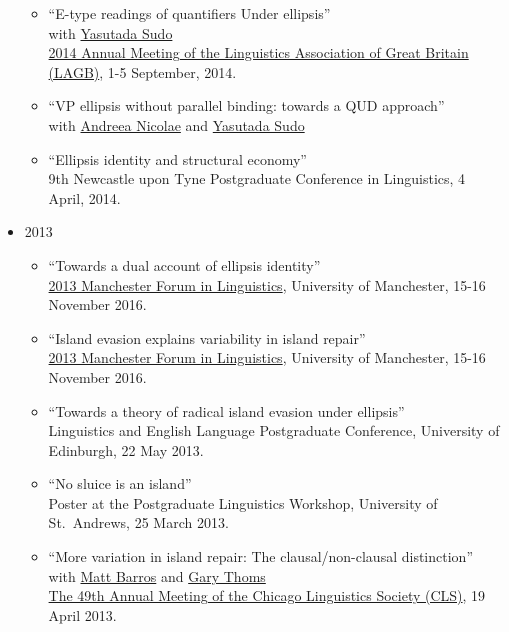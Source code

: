 \documentclass[]{article}
\providecommand{\tightlist}{%
  \setlength{\itemsep}{0pt}\setlength{\parskip}{0pt}}
\begin{document}
\begin{itemize}
  \begin{itemize}
  \tightlist
  \item
    ``E-type readings of quantifiers Under ellipsis''\\
    with \href{http://www.ucl.ac.uk/~ucjtudo/}{Yasutada Sudo}\\
    \href{http://www.lagb.org.uk/lagb2014/home}{2014 Annual Meeting of
    the Linguistics Association of Great Britain (LAGB)}, 1-5 September,
    2014.
  \item
    ``VP ellipsis without parallel binding: towards a QUD approach''\\
    with \href{...}{Andreea Nicolae} and
    \href{http://www.ucl.ac.uk/~ucjtudo/}{Yasutada Sudo}
  \item
    ``Ellipsis identity and structural economy''\\
    9th Newcastle upon Tyne Postgraduate Conference in Linguistics, 4
    April, 2014.
  \end{itemize}
\item
  2013

  \begin{itemize}
  \tightlist
  \item
    ``Towards a dual account of ellipsis identity''\\
    \href{https://mfilconf.wordpress.com/archive/mfil-2013-programme/}{2013
    Manchester Forum in Linguistics}, University of Manchester, 15-16
    November 2016.
  \item
    ``Island evasion explains variability in island repair''\\
    \href{https://mfilconf.wordpress.com/archive/mfil-2013-programme/}{2013
    Manchester Forum in Linguistics}, University of Manchester, 15-16
    November 2016.
  \item
    ``Towards a theory of radical island evasion under ellipsis''\\
    Linguistics and English Language Postgraduate Conference, University
    of Edinburgh, 22 May 2013.
  \item
    ``No sluice is an island''\\
    Poster at the Postgraduate Linguistics Workshop, University of
    St.~Andrews, 25 March 2013.
  \item
    ``More variation in island repair: The clausal/non-clausal
    distinction''\\
    with \href{...}{Matt Barros} and \href{...}{Gary Thoms}\\
    \href{...}{The 49th Annual Meeting of the Chicago Linguistics
    Society (CLS)}, 19 April 2013.
  \end{itemize}
\end{itemize}
\end{document}
